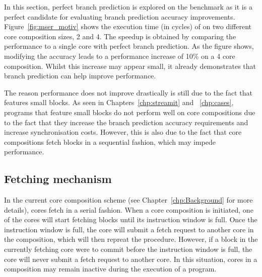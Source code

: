 In this section, perfect branch prediction is explored on the  benchmark as it is a perfect candidate for evaluating branch prediction accuracy improvements.
Figure~\ref{fig:mser_motiv} shows the execution time (in cycles) of  on two different core composition sizes, 2 and 4.
The speedup is obtained by comparing the performance to a single core with perfect branch prediction.
As the figure shows, modifying the accuracy leads to a performance increase of 10\% on a 4 core composition.
Whilst this increase may appear small, it already demonstrates that branch prediction can help improve performance.

The reason performance does not improve drastically is still due to the fact that  features small blocks.
As seen in Chapters~\ref{chp:streamit} and ~\ref{chp:cases}, programs that feature small blocks do not perform well on core compositions due to the fact that they increase the branch prediction accuracy requirements and increase synchronisation costs.
However, this is also due to the fact that core compositions fetch blocks in a sequential fashion, which may impede performance.

\subsection{Fetching mechanism}


In the current core composition scheme (see Chapter~\ref{chp:Background} for more details), cores fetch in a serial fashion.
When a core composition is initiated, one of the cores will start fetching blocks until its instruction window is full.
Once the instruction window is full, the core will submit a fetch request to another core in the composition, which will then repreat the procedure.
However, if a block in the currently fetching core were to commit before the instruction window is full, the core will never submit a fetch request to another core.
In this situation, cores in a composition may remain inactive during the execution of a program.

